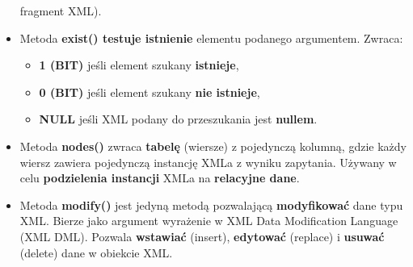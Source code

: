 \documentclass[a4paper]{article}
\begin{document}
\begin{itemize}[noitemsep]
        fragment XML).
        \item Metoda \textbf{exist() testuje istnienie} elementu podanego argumentem. Zwraca:
        \begin{itemize}[noitemsep]
            \item \textbf{1 (BIT)} jeśli element szukany \textbf{istnieje},
            \item \textbf{0 (BIT)} jeśli element szukany \textbf{nie istnieje},
            \item \textbf{NULL} jeśli XML podany do przeszukania jest \textbf{nullem}.
        \end{itemize}
        \item Metoda \textbf{nodes()} zwraca \textbf{tabelę} (wiersze) z pojedynczą kolumną, gdzie każdy wiersz zawiera
        pojedynczą instancję XMLa z wyniku zapytania. Używany w celu \textbf{podzielenia instancji} XMLa na
        \textbf{relacyjne dane}.
        \item Metoda \textbf{modify()} jest jedyną metodą pozwalającą \textbf{modyfikować} dane typu XML. Bierze jako
        argument wyrażenie w XML Data Modification Language (XML DML). Pozwala \textbf{wstawiać} (insert),
        \textbf{edytować} (replace) i \textbf{usuwać} (delete) dane w obiekcie XML.
    \end{itemize}
\end{document}
